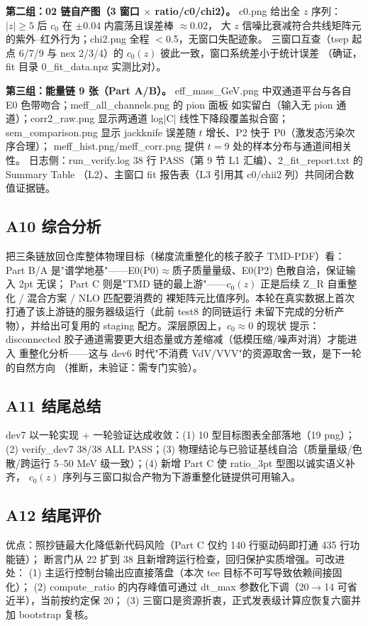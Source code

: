 \documentclass[UTF8]{ctexart}
\begin{document}
\textbf{第二组：02 链自产图（3 窗口 $\times$ ratio/c0/chi2）。}
c0.png 给出全 $z$ 序列：$|z|\ge 5$ 后 $c_0$ 在 $\pm0.04$ 内震荡且误差棒 $\approx0.02$，
大 $z$ 信噪比衰减符合共线矩阵元的紫外--红外行为；chi2.png 全程 $<$0.5，无窗口失配迹象。
三窗口互查（tsep 起点 6/7/9 与 nex 2/3/4）的 $c_0(z)$ 彼此一致，窗口系统差小于统计误差
（确证，fit 目录 0\_fit\_data.npz 实测比对）。

\textbf{第三组：能量链 9 张（Part A/B）。}
eff\_mass\_GeV.png 中双通道平台与各自 E0 色带吻合；meff\_all\_channels.png 的 pion 面板
如实留白（输入无 pion 通道）；corr2\_raw.png 显示两通道 log|C| 线性下降段覆盖拟合窗；
sem\_comparison.png 显示 jackknife 误差随 $t$ 增长、P2 快于 P0（激发态污染次序合理）；
meff\_hist.png/meff\_corr.png 提供 $t=9$ 处的样本分布与通道间相关性。
日志侧：run\_verify.log 38 行 PASS（第 9 节 L1 汇编）、2\_fit\_report.txt 的 Summary Table
（L2）、主窗口 fit 报告表（L3 引用其 c0/chii2 列）共同闭合数值证据链。

\subsection{A10 综合分析}
把三条链放回仓库整体物理目标（梯度流重整化的核子胶子 TMD-PDF）看：
Part B/A 是"谱学地基"——E0(P0)$\approx$质子质量量级、E0(P2) 色散自洽，保证输入 2pt 无误；
Part C 则是"TMD 链的最上游"——$c_0(z)$ 正是后续 Z\_R 自重整化 / 混合方案 / NLO 匹配要消费的
裸矩阵元比值序列。本轮在真实数据上首次打通了该上游链的服务器级运行（此前 test8 的同链运行
未留下完成的分析产物），并给出可复用的 staging 配方。深层原因上，$c_0\approx0$ 的现状
提示：disconnected 胶子通道需要更大组态量或方差缩减（低模压缩/噪声对消）才能进入
重整化分析——这与 dev6 时代"不消费 VdV/VVV"的资源取舍一致，是下一轮的自然方向
（推断，\textcolor{warn}{未验证}：需专门实验）。

\subsection{A11 结尾总结}
\begin{conclbox}
dev7 以一轮实现 + 一轮验证达成收敛：(1) 10 型目标图表全部落地（19 png）；
(2) verify\_dev7 38/38 ALL PASS；(3) 物理结论与已验证基线自洽（质量量级/色散/跨运行
5--50 MeV 级一致）；(4) 新增 Part C 使 ratio\_3pt 型图以诚实语义补齐，
$c_0(z)$ 序列与三窗口拟合产物为下游重整化链提供可用输入。
\end{conclbox}

\subsection{A12 结尾评价}
优点：照抄链最大化降低新代码风险（Part C 仅约 140 行驱动码即打通 435 行功能链）；
断言门从 22 扩到 38 且新增跨运行检查，回归保护实质增强。可改进处：
(1) 主运行控制台输出应直接落盘（本次 tee 目标不可写导致依赖间接固化）；
(2) compute\_ratio 的内存峰值可通过 dt\_max 参数化下调（20$\to$14 可省近半），当前按约定保 20；
(3) 三窗口是资源折衷，正式发表级计算应恢复六窗并加 bootstrap 复核。
\end{document}
